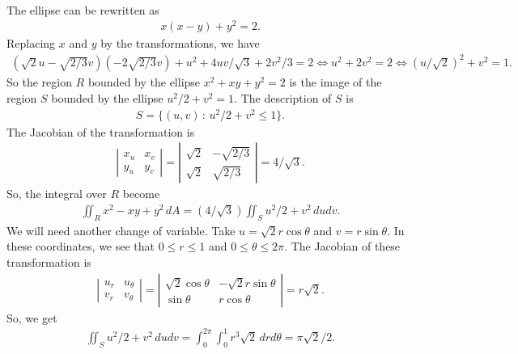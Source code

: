 	\spc 
	
	\\
	The ellipse can be rewritten as
		\begin{align*}
		x(x-y) + y^2 = 2 .
		\end{align*}
	Replacing $x$ and $y$ by the transformations, we have
		\begin{align*}
		(\sqrt{2} u - \sqrt{2/3} v)(-2\sqrt{2/3} v) + u^2 + 4uv/\sqrt{3} + 2v^2/3 = 2 \iff u^2 + 2v^2 = 2 \iff (u/\sqrt{2})^2 + v^2 = 1 .
		\end{align*}
	So the region $R$ bounded by the ellipse $x^2 + xy + y^2 = 2$ is the image of the region $S$ bounded by the ellipse $u^2/2 + v^2 = 1$. The description of $S$ is
		\begin{align*}
		S = \{ (u, v) \, : \, u^2/2 + v^2 \leq 1 \} .
		\end{align*}
	The Jacobian of the transformation is
		\begin{align*}
		\left| \begin{matrix}
		x_u & x_v \\
		y_u & y_v
		\end{matrix}
		\right| = \left| \begin{matrix}
		\sqrt{2} & -\sqrt{2/3} \\
		\sqrt{2} & \sqrt{2/3}
		\end{matrix}
		\right| = 4/\sqrt{3} .
		\end{align*}
	So, the integral over $R$ become
		\begin{align*}
		\iint_R x^2 - xy + y^2 \, dA = (4/\sqrt{3})\iint_S u^2/2 + v^2 \, du dv .
		\end{align*}
	We will need another change of variable. Take $u = \sqrt{2} r \cos \theta$ and $v = r \sin \theta$. In these coordinates, we see that $0 \leq r \leq 1$ and $0 \leq \theta \leq 2\pi$. The Jacobian of these transformation is
		\begin{align*}
		\left| \begin{matrix}
		u_r & u_\theta \\
		v_r & v_\theta
		\end{matrix} \right| = 
		\left| \begin{matrix}
		\sqrt{2} \cos \theta & - \sqrt{2} r \sin \theta \\
		\sin \theta & r \cos \theta
		\end{matrix} \right| = r \sqrt{2} .
		\end{align*}
	So, we get
		\begin{align*}
		\iint_S u^2/2 + v^2 \, dudv = \int_0^{2\pi} \int_0^1 r^3 \sqrt{2} \, dr d\theta = \pi \sqrt{2} /2 .
		\end{align*}

